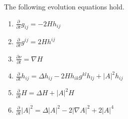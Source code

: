 \begin{lemma}
	The following evolution equations hold.
	\begin{enumerate}[\normalfont(1)]

		\item $\frac{\partial }{\partial t} g_{ij}=-2Hh_{ij}$
		\item $\frac{\partial }{\partial t} g^{ij}=2Hh^{ij}$
		\item $\frac{\partial \nu }{\partial t} = \nabla H$
		\item $\frac{\partial }{\partial t} h_{ij}=\Delta h_{ij}-2Hh_{ik}g^{kl}h_{lj}+\left| A \right| ^2 h_{ij}$
		\item $\frac{\partial }{\partial t} H=\Delta H+ \left| A \right| ^2 H$
		\item $\frac{\partial }{\partial t} \left| A \right| ^2 = \Delta \left| A \right| ^2 - 2 \left| \nabla A \right| ^2 + 2 \left| A \right| ^4$
	\end{enumerate}
\end{lemma}

